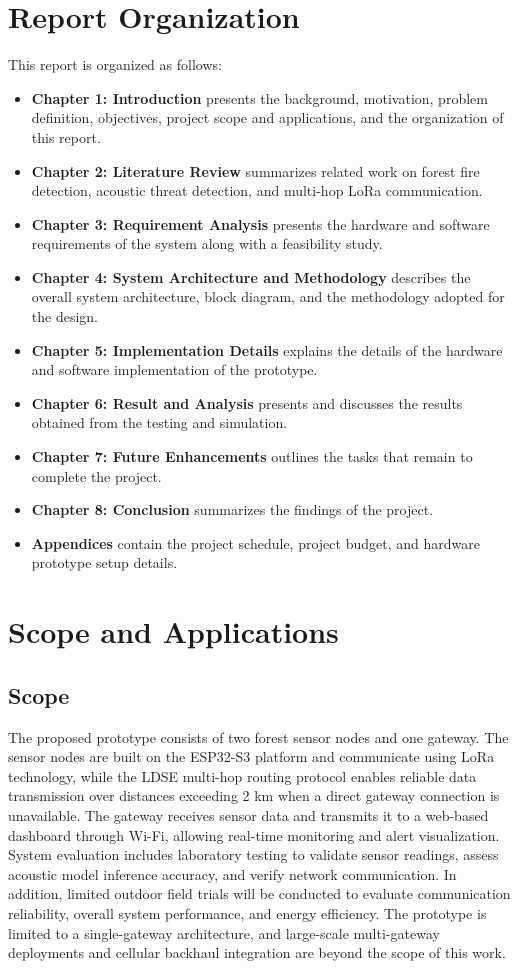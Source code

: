 \section{Report Organization}
This report is organized as follows:
\begin{itemize}
  \item \textbf{Chapter 1: Introduction} presents the background, motivation,
  problem definition, objectives, project scope and applications, and the
  organization of this report.
  \item \textbf{Chapter 2: Literature Review} summarizes related work on forest
  fire detection, acoustic threat detection, and multi-hop LoRa communication.
  \item \textbf{Chapter 3: Requirement Analysis} presents the hardware and
  software requirements of the system along with a feasibility study.
  \item \textbf{Chapter 4: System Architecture and Methodology} describes the
  overall system architecture, block diagram, and the methodology adopted for
  the design.
  \item \textbf{Chapter 5: Implementation Details} explains the details of the
  hardware and software implementation of the prototype.
  \item \textbf{Chapter 6: Result and Analysis} presents and discusses the
  results obtained from the testing and simulation.
  \item \textbf{Chapter 7: Future Enhancements} outlines the tasks that remain
  to complete the project.
  \item \textbf{Chapter 8: Conclusion} summarizes the findings of the project.
  \item \textbf{Appendices} contain the project schedule, project budget, and
  hardware prototype setup details.
\end{itemize}

\section{Scope and Applications}
\subsection{Scope}
The proposed prototype consists of two forest sensor nodes and one gateway. The sensor nodes are built on the ESP32-S3 platform and communicate using LoRa technology, while the LDSE multi-hop routing protocol enables reliable data transmission over distances exceeding 2 km when a direct gateway connection is unavailable. The gateway receives sensor data and transmits it to a web-based dashboard through Wi-Fi, allowing real-time monitoring and alert visualization. System evaluation includes laboratory testing to validate sensor readings, assess acoustic model inference accuracy, and verify network communication. In addition, limited outdoor field trials will be conducted to evaluate communication reliability, overall system performance, and energy efficiency. The prototype is limited to a single-gateway architecture, and large-scale multi-gateway deployments and cellular backhaul integration are beyond the scope of this work.
\newpage
